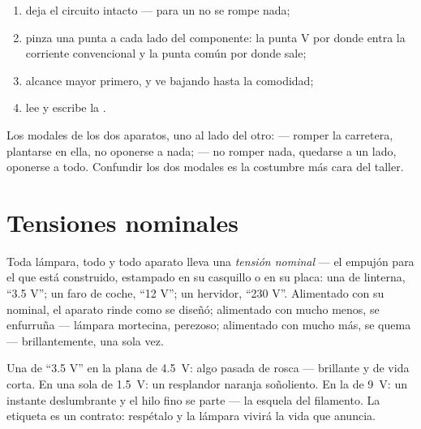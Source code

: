 \begin{method}\label{met:g8:voltage-voltmeter:measure}
\begin{enumerate}
  \item deja el circuito intacto --- para un  no se
        rompe nada;
  \item pinza una punta a cada lado del componente: la punta
        \unit{V} por donde entra la corriente convencional y la
        punta común por donde sale;
  \item alcance mayor primero, y ve bajando hasta la comodidad;
  \item lee y escribe la .
\end{enumerate}
Los modales de los dos aparatos, uno al lado del otro:
 --- romper la carretera, plantarse en ella, no
oponerse a nada;  --- no romper nada, quedarse a un
lado, oponerse a todo. Confundir los dos modales es la costumbre más
cara del taller.
\end{method}

\section{Tensiones nominales}

\begin{definition}\label{def:g8:voltage-voltmeter:nominal}
Toda lámpara, todo  y todo aparato lleva una \emph{tensión
nominal} --- el empujón para el que está
construido, estampado en su casquillo o en su placa: una
 de linterna, ``3.5 V''; un faro de coche, ``12 V''; un
hervidor, ``230 V''. Alimentado con su  nominal, el
aparato rinde como se diseñó; alimentado con mucho menos, se enfurruña
--- lámpara mortecina,  perezoso; alimentado con mucho más, se
quema --- brillantemente, una sola vez.
\end{definition}

\begin{example}\label{ex:g8:voltage-voltmeter:matching}
Una  de ``3.5 V'' en la  plana de
\qty{4.5}{V}: algo pasada de rosca --- brillante y de vida corta. En
una sola  de \qty{1.5}{V}: un resplandor naranja soñoliento. En la
 de \qty{9}{V}: un instante deslumbrante y el hilo fino se
parte --- la esquela del filamento. La etiqueta es un contrato:
respétalo y la lámpara vivirá la vida que anuncia.
\end{example}

